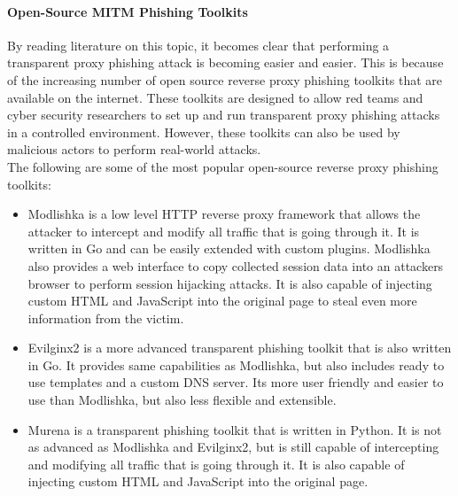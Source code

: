 \documentclass[12pt]{scrbook}
\begin{document}
\paragraph{Open-Source MITM Phishing Toolkits}
By reading literature on this topic, it becomes clear that
performing a transparent proxy phishing attack is
becoming easier and easier. This is because of the increasing number of open
source reverse proxy phishing toolkits that are available on the internet. These
toolkits are designed to allow red teams and cyber security researchers to set
up and run transparent proxy phishing attacks in a controlled environment.
However, these toolkits can also be used by malicious actors to perform
real-world attacks.\\The following are some of the most popular open-source
reverse proxy phishing toolkits:
\begin{itemize}
	\item Modlishka \cite{ModlishkaGithub} is a low level HTTP reverse proxy framework
	      that allows the
	      attacker to intercept and modify all traffic that is going through it. It
	      is
	      written in Go and can be easily extended with custom plugins. Modlishka
	      also
	      provides a web interface to copy collected session data into an attackers
	      browser to perform session hijacking attacks. It is also capable of
	      injecting
	      custom HTML and JavaScript into the original page to steal even more
	      information from the victim.
	\item Evilginx2 \cite{EvilnginxGithub} is a more advanced transparent phishing
	      toolkit that is also written in Go. It provides same capabilities as
	      Modlishka, but also includes ready to use templates and a custom DNS
	      server.
	      Its more user friendly and easier to use than Modlishka, but also less
	      flexible and extensible.
	\item Murena \cite{MuraenaGithub} is a transparent phishing toolkit that is written
	      in Python. It is not as advanced as Modlishka and Evilginx2, but is still
	      capable of intercepting and modifying all traffic that is going through
	      it.
	      It is also capable of injecting custom HTML and JavaScript into the
	      original
	      page.
\end{itemize}
\end{document}
